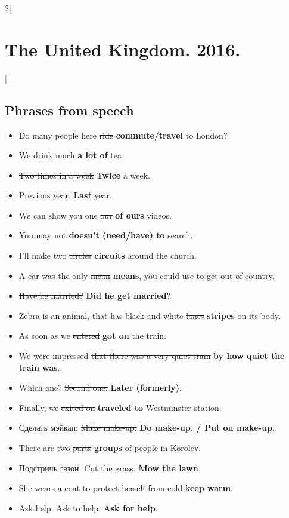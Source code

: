 \documentclass[10pt,a4paper]{article}
\newlength{\OriginalParIndent}
\newenvironment{ItemizeWithOrigParIndent}
    {\begin{itemize}[leftmargin=\OriginalParIndent]}
    {\end{itemize}}
\begin{document}

\newpage
\setcounter{secnumdepth}{3} %

\begin{multicols}{2}[\section{The United Kingdom. 2016.}]

\subsection{Phrases from speech}

\begin{ItemizeWithOrigParIndent}
  \item Do many people here \sout{ride} \textbf{commute/travel} to London?
  \item We drink \sout{much} \textbf{a lot of} tea.
  \item \sout{Two times in a week} \textbf{Twice} a week.
  \item \sout{Previous year.} \textbf{Last} year.
  \item We can show you one \sout{our} \textbf{of ours} videos.
  \item You \sout{may not} \textbf{doesn't (need/have) to} search.
  \item I'll make two \sout{circles} \textbf{circuits} around the church.
  \item A car was the only \sout{mean} \textbf{means}, you could use to get out of country.
  \item \sout{Have he married?} \textbf{Did he get married?}
  \item Zebra is an animal, that has black and white \sout{lanes} \textbf{stripes} on its body.
  \item As soon as we \sout{entered} \textbf{got on} the train.
  \item We were impressed \sout{that there was a very quiet train} \textbf{by
        how quiet the train was}.
  \item Which one? \sout{Second one.} \textbf{Later (formerly).}
  \item Finally, we \sout{exited on} \textbf{traveled to} Westminster station.
  \item Сделать мэйкап: \sout{Make make-up.} \textbf{Do make-up. / Put on make-up.}
  \item There are two \sout{parts} \textbf{groups} of people in Korolev.
  \item Подстричь газон: \sout{Cut the grass.} \textbf{Mow the lawn}.
  \item She wears a coat to \sout{protect herself from cold} \textbf{keep warm}.
  \item \sout{Ask help. Ask to help.} \textbf{Ask for help}.


\end{ItemizeWithOrigParIndent}
\end{multicols}
\end{document}
